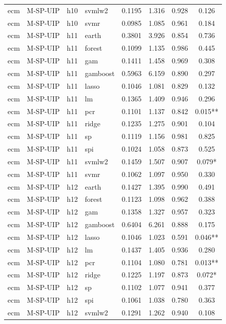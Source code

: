 \begin{ThreePartTable}
\begin{longtable}[t]{llclcccc}
ecm & M-SP-UIP & h10 & svmlw2 & 0.1195 & 1.316 & 0.928 & 0.126\\
ecm & M-SP-UIP & h10 & svmr & 0.0985 & 1.085 & 0.961 & 0.184\\
\addlinespace
ecm & M-SP-UIP & h11 & earth & 0.3801 & 3.926 & 0.854 & 0.736\\
ecm & M-SP-UIP & h11 & forest & 0.1099 & 1.135 & 0.986 & 0.445\\
ecm & M-SP-UIP & h11 & gam & 0.1411 & 1.458 & 0.969 & 0.308\\
ecm & M-SP-UIP & h11 & gamboost & 0.5963 & 6.159 & 0.890 & 0.297\\
ecm & M-SP-UIP & h11 & lasso & 0.1046 & 1.081 & 0.829 & 0.132\\
ecm & M-SP-UIP & h11 & lm & 0.1365 & 1.409 & 0.946 & 0.296\\
ecm & M-SP-UIP & h11 & pcr & 0.1101 & 1.137 & 0.842 & 0.015**\\
ecm & M-SP-UIP & h11 & ridge & 0.1235 & 1.275 & 0.901 & 0.104\\
ecm & M-SP-UIP & h11 & sp & 0.1119 & 1.156 & 0.981 & 0.825\\
ecm & M-SP-UIP & h11 & spi & 0.1024 & 1.058 & 0.873 & 0.525\\
ecm & M-SP-UIP & h11 & svmlw2 & 0.1459 & 1.507 & 0.907 & 0.079*\\
ecm & M-SP-UIP & h11 & svmr & 0.1062 & 1.097 & 0.950 & 0.330\\
\addlinespace
ecm & M-SP-UIP & h12 & earth & 0.1427 & 1.395 & 0.990 & 0.491\\
ecm & M-SP-UIP & h12 & forest & 0.1123 & 1.098 & 0.962 & 0.388\\
ecm & M-SP-UIP & h12 & gam & 0.1358 & 1.327 & 0.957 & 0.323\\
ecm & M-SP-UIP & h12 & gamboost & 0.6404 & 6.261 & 0.888 & 0.175\\
ecm & M-SP-UIP & h12 & lasso & 0.1046 & 1.023 & 0.591 & 0.046**\\
ecm & M-SP-UIP & h12 & lm & 0.1437 & 1.405 & 0.936 & 0.280\\
ecm & M-SP-UIP & h12 & pcr & 0.1104 & 1.080 & 0.781 & 0.013**\\
ecm & M-SP-UIP & h12 & ridge & 0.1225 & 1.197 & 0.873 & 0.072*\\
ecm & M-SP-UIP & h12 & sp & 0.1102 & 1.077 & 0.941 & 0.377\\
ecm & M-SP-UIP & h12 & spi & 0.1061 & 1.038 & 0.780 & 0.363\\
ecm & M-SP-UIP & h12 & svmlw2 & 0.1291 & 1.262 & 0.940 & 0.108\\

\end{longtable}
\end{ThreePartTable}
